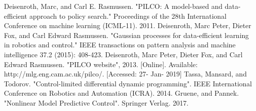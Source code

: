 \documentclass[letterpaper, 10 pt, conference]{ieeeconf}  %
\begin{document}
\begin{thebibliography}{99}

 Deisenroth, Marc, and Carl E. Rasmussen. "PILCO: A model-based and data-efficient approach to policy search." Proceedings of the 28th International Conference on machine learning (ICML-11). 2011.
 Deisenroth, Marc Peter, Dieter Fox, and Carl Edward Rasmussen. "Gaussian processes for data-efficient learning in robotics and control." IEEE transactions on pattern analysis and machine intelligence 37.2 (2015): 408-423.
 Deisenroth, Marc Peter, Dieter Fox, and Carl Edward Rasmussen. "PILCO website", 2013. [Online]. Available: http://mlg.eng.cam.ac.uk/pilco/. [Accessed: 27- Jan- 2019]
 Tassa, Mansard, and Todorov. "Control-limited differential dynamic programming". IEEE International Conference on Robotics and Automation (ICRA). 2014.
 Gruene, and Pannek. "Nonlinear Model Predictive Control". Springer Verlag. 2017.


\end{thebibliography}
\end{document}
